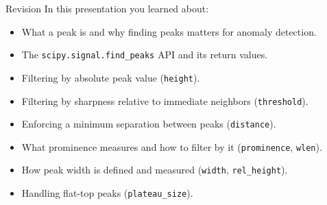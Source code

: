 \documentclass{beamer}
\begin{document}
\begin{frame}{Revision}
  In this presentation you learned about:
  \begin{itemize}
    \item What a peak is and why finding peaks matters for anomaly detection.
    \item The \texttt{scipy.signal.find\_peaks} API and its return values.
    \item Filtering by absolute peak value (\texttt{height}).
    \item Filtering by sharpness relative to immediate neighbors (\texttt{threshold}).
    \item Enforcing a minimum separation between peaks (\texttt{distance}).
    \item What prominence measures and how to filter by it (\texttt{prominence}, \texttt{wlen}).
    \item How peak width is defined and measured (\texttt{width}, \texttt{rel\_height}).
    \item Handling flat-top peaks (\texttt{plateau\_size}).
  \end{itemize}
\end{frame}
\end{document}

